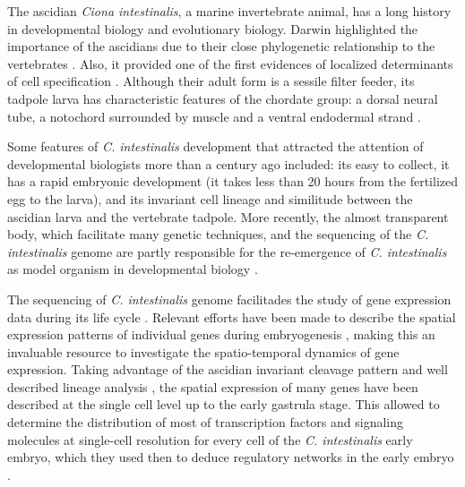
	The ascidian \textit{Ciona intestinalis}, a marine invertebrate animal, has a long history in developmental biology and evolutionary biology. 
	Darwin highlighted the importance of the ascidians due to their close phylogenetic relationship to the vertebrates \citep{Darwin20009}. Also, it provided one of the first evidences of localized determinants of cell specification \citep{Conklin1905}. Although their adult form is a sessile filter feeder, its tadpole larva has characteristic features of the chordate group: a dorsal neural tube, a notochord surrounded by muscle and a ventral endodermal strand \cite{Satoh2003}.
	
	Some features of \textit{C. intestinalis} development that attracted the attention of developmental biologists more than a century ago \citep{kowalewski1866entwicklungsgeschichte,chabry1887contribution} included: its easy to collect, it has a rapid embryonic development (it takes less than 20 hours from the fertilized egg to the larva), and its invariant cell lineage and similitude between the ascidian larva and the vertebrate tadpole.
	More recently, the almost transparent body, which facilitate many genetic techniques, and the sequencing of the \textit{C. intestinalis} genome \citep{Dehal2002} are partly responsible for the re-emergence of \textit{C. intestinalis} as model organism in developmental biology \citep{Levin2012}.
	
The sequencing of \textit{C. intestinalis} genome facilitades the study of gene expression data during its life cycle \citep{Azumi2007}. Relevant efforts have been made to describe the spatial expression patterns of individual genes during embryogenesis \citep{Satou2001,Fujiwara2002,Kusakabe2002,Imai2004,Miwata2006}, making this an invaluable resource to investigate the spatio-temporal dynamics of gene expression. Taking advantage of the ascidian invariant cleavage pattern and well described lineage analysis \citep{Conklin1905,Nishida1987}, the spatial expression of many genes have been described at the single cell level up to the early gastrula stage.
This allowed \citet{Imai2006} to determine the distribution of most of transcription factors and signaling molecules at single-cell resolution for every cell of the \textit{C. intestinalis} early embryo, which they used then to deduce regulatory networks in the early embryo \citep{Imai2006}.


